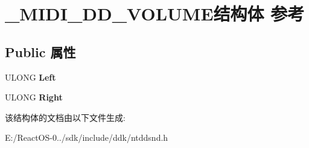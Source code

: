 \hypertarget{struct___m_i_d_i___d_d___v_o_l_u_m_e}{}\section{\+\_\+\+M\+I\+D\+I\+\_\+\+D\+D\+\_\+\+V\+O\+L\+U\+M\+E结构体 参考}
\label{struct___m_i_d_i___d_d___v_o_l_u_m_e}
\subsection*{Public 属性}
\begin{DoxyCompactItemize}
\item 
\mbox{\label{struct___m_i_d_i___d_d___v_o_l_u_m_e_ae7d4e2810c3275fe6f3d7bac08752a40}} 
U\+L\+O\+NG {\bfseries Left}
\item 
\mbox{\label{struct___m_i_d_i___d_d___v_o_l_u_m_e_a8caa6b5927cd74da1baad410654e4963}} 
U\+L\+O\+NG {\bfseries Right}
\end{DoxyCompactItemize}


该结构体的文档由以下文件生成\+:\begin{DoxyCompactItemize}
\item 
E\+:/\+React\+O\+S-\/0../sdk/include/ddk/ntddsnd.\+h\end{DoxyCompactItemize}

